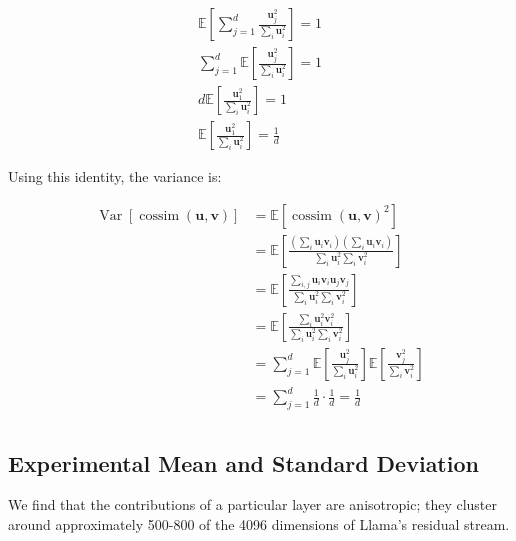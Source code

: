 \begin{align*}
\mathbb{E}\left[ \sum_{j=1}^d  \frac{\mathbf{u}_j^2}{\sum_i \mathbf{u}_i^2} \right] = 1 \\
\sum_{j=1}^d \mathbb{E}\left[   \frac{\mathbf{u}_j^2}{\sum_i \mathbf{u}_i^2} \right] = 1 \\
d\mathbb{E}\left[   \frac{\mathbf{u}_1^2}{\sum_i \mathbf{u}_i^2} \right] = 1\\ \mathbb{E}\left[   \frac{\mathbf{u}_1^2}{\sum_i \mathbf{u}_i^2} \right] = \frac{1}{d}
\end{align*}

Using this identity, the variance is:

\begin{align*}
\operatorname{Var}[\operatorname{cossim}(\mathbf{u}, \mathbf{v})] &= \mathbb{E}[\operatorname{cossim}(\mathbf{u}, \mathbf{v})^2]\\
&= \mathbb{E}\left[ \frac{(\sum_i \mathbf{u}_{i} \mathbf{v}_{i})(\sum_i \mathbf{u}_{i} \mathbf{v}_{i})}{\sum_i \mathbf{u}_i^2 \sum_i \mathbf{v}_i^2} \right]\\
&= \mathbb{E}\left[ \frac{\sum_{i,j} \mathbf{u}_{i} \mathbf{v}_{i} \mathbf{u}_{j} \mathbf{v}_{j}}{\sum_i \mathbf{u}_i^2 \sum_i \mathbf{v}_i^2} \right]\\
&= \mathbb{E}\left[ \frac{\sum_{i} \mathbf{u}_{i}^2 \mathbf{v}_{i}^2}{\sum_i \mathbf{u}_i^2 \sum_i \mathbf{v}_i^2} \right]\\
&= \sum_{j=1}^d \mathbb{E}\left[ \frac{\mathbf{u}_j^2}{\sum_i \mathbf{u}_i^2} \right] \mathbb{E}\left[ \frac{\mathbf{v}_j^2}{\sum_i \mathbf{v}_i^2} \right]\\
&= \sum_{j=1}^d \frac{1}{d} \cdot \frac{1}{d} = \frac{1}{d}\\
\end{align*}


\subsection{Experimental Mean and Standard Deviation}
\label{appendix:empirical_mean_and_variance}


We find that the contributions of a particular layer are anisotropic; they cluster around approximately 500-800 of the 4096 dimensions of Llama's residual stream.

